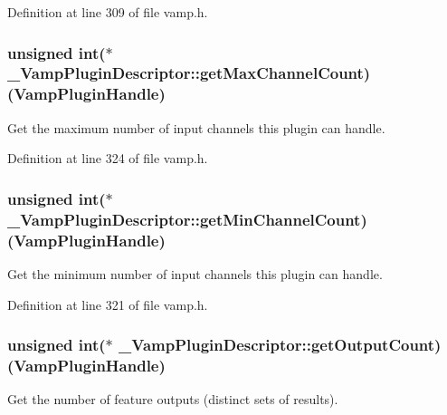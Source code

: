 Definition at line 309 of file vamp.\+h.

\subsubsection[{\texorpdfstring{get\+Max\+Channel\+Count}{getMaxChannelCount}}]{\setlength{\rightskip}{0pt plus 5cm}unsigned {\bf int}($\ast$ \+\_\+\+Vamp\+Plugin\+Descriptor\+::get\+Max\+Channel\+Count) ({\bf Vamp\+Plugin\+Handle})}\hypertarget{struct___vamp_plugin_descriptor_af34bce679c821c38dbd212a0ef1bf867}{}\label{struct___vamp_plugin_descriptor_af34bce679c821c38dbd212a0ef1bf867}
Get the maximum number of input channels this plugin can handle. 

Definition at line 324 of file vamp.\+h.

\subsubsection[{\texorpdfstring{get\+Min\+Channel\+Count}{getMinChannelCount}}]{\setlength{\rightskip}{0pt plus 5cm}unsigned {\bf int}($\ast$ \+\_\+\+Vamp\+Plugin\+Descriptor\+::get\+Min\+Channel\+Count) ({\bf Vamp\+Plugin\+Handle})}\hypertarget{struct___vamp_plugin_descriptor_a8a9be1cf9e70d46d20cac1b0049149cd}{}\label{struct___vamp_plugin_descriptor_a8a9be1cf9e70d46d20cac1b0049149cd}
Get the minimum number of input channels this plugin can handle. 

Definition at line 321 of file vamp.\+h.

\subsubsection[{\texorpdfstring{get\+Output\+Count}{getOutputCount}}]{\setlength{\rightskip}{0pt plus 5cm}unsigned {\bf int}($\ast$ \+\_\+\+Vamp\+Plugin\+Descriptor\+::get\+Output\+Count) ({\bf Vamp\+Plugin\+Handle})}\hypertarget{struct___vamp_plugin_descriptor_a71825defc0052a8ac307e2c333c4b935}{}\label{struct___vamp_plugin_descriptor_a71825defc0052a8ac307e2c333c4b935}
Get the number of feature outputs (distinct sets of results). 

